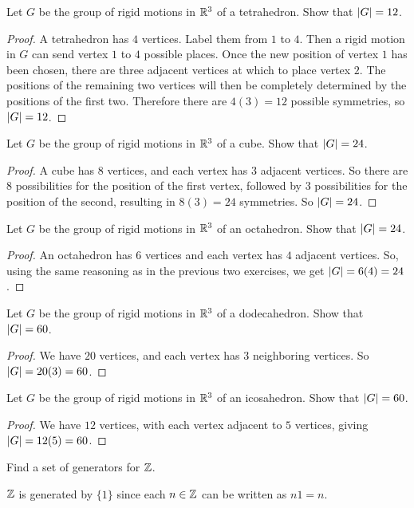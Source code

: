  Let $G$ be the group of rigid motions in $\mathbb{R}^3$ of a
tetrahedron. Show that $\lvert{G}\rvert = 12$.
\begin{proof}
  A tetrahedron has $4$ vertices. Label them from $1$ to $4$. Then a
  rigid motion in $G$ can send vertex $1$ to $4$ possible places. Once
  the new position of vertex $1$ has been chosen, there are three
  adjacent vertices at which to place vertex $2$. The positions of the
  remaining two vertices will then be completely determined by the
  positions of the first two. Therefore there are $4(3) = 12$ possible
  symmetries, so $\lvert{G}\rvert = 12$.
\end{proof}

 Let $G$ be the group of rigid motions in $\mathbb{R}^3$ of a
cube. Show that $\lvert{G}\rvert = 24$.
\begin{proof}
  A cube has $8$ vertices, and each vertex has $3$ adjacent
  vertices. So there are $8$ possibilities for the position of the
  first vertex, followed by $3$ possibilities for the position of the
  second, resulting in $8(3) = 24$ symmetries. So $\lvert{G}\rvert = 24$.
\end{proof}

 Let $G$ be the group of rigid motions in $\mathbb{R}^3$ of an
octahedron. Show that $\lvert{G}\rvert = 24$.
\begin{proof}
  An octahedron has $6$ vertices and each vertex has $4$ adjacent
  vertices. So, using the same reasoning as in the previous two
  exercises, we get $\lvert{G}\rvert = 6(4) = 24$.
\end{proof}

 Let $G$ be the group of rigid motions in $\mathbb{R}^3$ of a
dodecahedron. Show that $\lvert{G}\rvert = 60$.
\begin{proof}
  We have $20$ vertices, and each vertex has $3$ neighboring
  vertices. So $\lvert{G}\rvert = 20(3) = 60$.
\end{proof}

 Let $G$ be the group of rigid motions in $\mathbb{R}^3$ of an
icosahedron. Show that $\lvert{G}\rvert = 60$.
\begin{proof}
  We have $12$ vertices, with each vertex adjacent to $5$ vertices,
  giving $\lvert{G}\rvert = 12(5) = 60$.
\end{proof}

 Find a set of generators for $\mathbb{Z}$.
\begin{solution}
  $\mathbb{Z}$ is generated by $\{1\}$ since each $n\in\mathbb{Z}$ can be written as
  $n1 = n$.
\end{solution}

